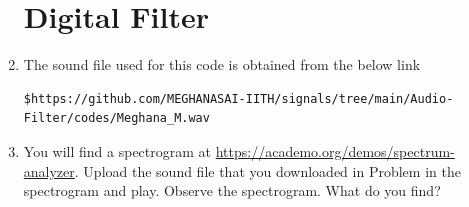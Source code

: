 \documentclass[journal,12pt,twocolumn]{IEEEtran}
\theoremstyle{remark}
\begin{document}
\begin{enumerate}[label=\thesection.\arabic*,ref=\thesection.\theenumi]
\section{Digital Filter}
\label{input_sound}
\item The sound file used for this code is obtained from the below link
\begin{lstlisting}
$https://github.com/MEGHANASAI-IITH/signals/tree/main/Audio-Filter/codes/Meghana_M.wav
\end{lstlisting}

\item
\label{prob:spectrogram}
You will find a spectrogram at \href{https://academo.org/demos/spectrum-analyzer}{\url{https://academo.org/demos/spectrum-analyzer}}. 
Upload the sound file that you downloaded in Problem  in the spectrogram  and play.  Observe the spectrogram. What do you find?
\\


\end{enumerate}
\end{document}
